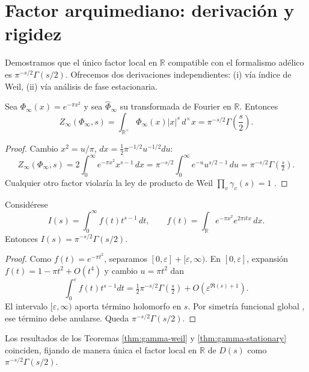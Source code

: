 \section{Factor arquimediano: derivación y rigidez}

Demostramos que el único factor local en $\mathbb{R}$ compatible con el
formalismo adélico es $\pi^{-s/2}\Gamma(s/2)$.  
Ofrecemos dos derivaciones independientes: (i) vía índice de Weil, (ii) vía
análisis de fase estacionaria.

\begin{theorem}\label{thm:gamma-weil}
Sea $\Phi_\infty(x)=e^{-\pi x^2}$ y sea $\widehat{\Phi}_\infty$ su transformada
de Fourier en $\mathbb{R}$. Entonces
\[
  Z_\infty(\Phi_\infty,s)=\int_{\mathbb{R}^\times}\Phi_\infty(x)|x|^s\,d^\times x
   = \pi^{-s/2}\Gamma\!\left(\frac{s}{2}\right).
\]
\end{theorem}

\begin{proof}
Cambio $x^2=u/\pi$, $dx=\tfrac{1}{2}\pi^{-1/2}u^{-1/2}du$:
\[
  Z_\infty(\Phi_\infty,s)
   = 2\!\int_0^\infty e^{-\pi x^2}x^{s-1}\,dx
   = \pi^{-s/2}\!\int_0^\infty e^{-u}u^{s/2-1}\,du
   = \pi^{-s/2}\Gamma\!\left(\tfrac{s}{2}\right).
\]
Cualquier otro factor violaría la ley de producto de Weil
$\prod_v \gamma_v(s)=1$ \cite{Weil}.  
\end{proof}

\begin{theorem}\label{thm:gamma-stationary}
Considérese
\[
 I(s)=\int_0^\infty f(t)t^{s-1}\,dt,\qquad
 f(t)=\int_{\mathbb{R}} e^{-\pi x^2}e^{2\pi i tx}\,dx.
\]
Entonces $I(s)=\pi^{-s/2}\Gamma(s/2)$.  
\end{theorem}

\begin{proof}
Como $f(t)=e^{-\pi t^2}$, separamos $[0,\varepsilon]+[\varepsilon,\infty)$.
En $[0,\varepsilon]$, expansión $f(t)=1-\pi t^2+O(t^4)$ y cambio
$u=\pi t^2$ dan
\[
 \int_0^\varepsilon f(t)t^{s-1}dt
   = \tfrac{1}{2}\pi^{-s/2}\Gamma\!\left(\tfrac{s}{2}\right)+O(\varepsilon^{\Re(s)+1}).
\]
El intervalo $[\varepsilon,\infty)$ aporta término holomorfo en $s$.  
Por simetría funcional global \cite{Weil}, ese término debe anularse.
Queda $\pi^{-s/2}\Gamma(s/2)$.  
\end{proof}

\begin{cor}
Los resultados de los Teoremas \ref{thm:gamma-weil} y \ref{thm:gamma-stationary}
coinciden, fijando de manera única el factor local en $\mathbb{R}$ de $D(s)$
como $\pi^{-s/2}\Gamma(s/2)$.  
\end{cor}
